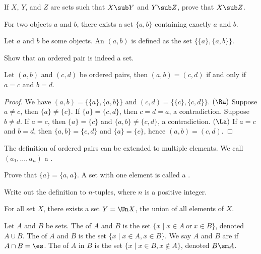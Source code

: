 \documentclass[10pt]{article}
\begin{document}
\begin{problem}
    If $X$, $Y$, and $Z$ are sets such that $X\sub Y$ and $Y\sub Z$, prove that $X\sub Z$.
\end{problem}
\begin{Axiom of pairing}
    For two objects $a$ and $b$, there exists a set $\{a,b\}$ containing exactly $a$ and $b$.
\end{Axiom of pairing}
\begin{definition}
    Let $a$ and $b$ be some objects. An  $(a,b)$ is defined as the set $\{\{a\},\{a,b\}\}$.
\end{definition}
\begin{problem}
    Show that an ordered pair is indeed a set.
\end{problem}
\begin{proposition}
    Let $(a,b)$ and $(c,d)$ be ordered pairs, then $(a,b)=(c,d)$ if and only if $a=c$ and $b=d$.
\end{proposition}
\begin{proof}
    We have $(a,b)=\{\{a\},\{a,b\}\}$ and $(c,d)=\{\{c\},\{c,d\}\}$. $(\Ra)$ Suppose $a\ne c$, then $\{a\}\ne\{c\}$. If $\{a\}=\{c,d\}$, then $c=d=a$, a contradiction. Suppose $b\ne d$. If $a=c$, then $\{a\}=\{c\}$ and $\{a,b\}\ne\{c,d\}$, a contradiction. $(\La)$ If $a=c$ and $b=d$, then $\{a,b\}=\{c,d\}$ and $\{a\}=\{c\}$, hence $(a,b)=(c,d)$.
\end{proof}
\par
The definition of ordered pairs can be extended to multiple elements. We call $({a}_{1},\dots,{a}_{n})$ a .
\begin{problem}
    Prove that $\{a\}=\{a,a\}$. A set with one element is called a .
\end{problem}
\begin{problem}
    Write out the definition to $n$-tuples, where $n$ is a positive integer.
\end{problem}
\begin{Axiom of union}
    For all set $X$, there exists a set $Y=\Un X$, the union of all elements of $X$.
\end{Axiom of union}
\begin{definition}
    Let $A$ and $B$ be sets. The  of $A$ and $B$ is the set $\{x\mid x\in A\ \text{or}\ x\in B\}$, denoted $A\cup B$. The  of $A$ and $B$ is the set $\{x\mid x\in A,x\in B\}$. We say $A$ and $B$ are  if $A\cap B=\es$. The  of $A$ in $B$ is the set $\{x\mid x\in B,x\notin A\}$, denoted $B\sm A$.
\end{definition}
\end{document}

